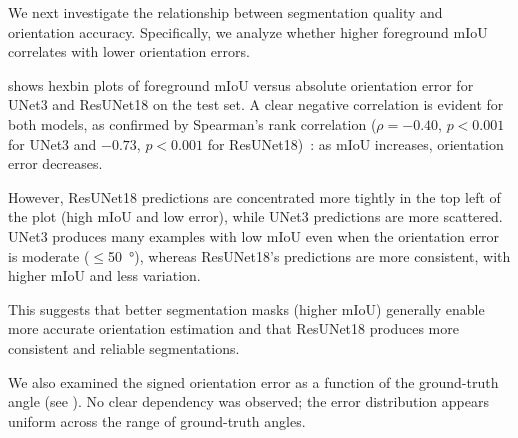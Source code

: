 We next investigate the relationship between segmentation quality and orientation accuracy.
Specifically, we analyze whether higher foreground mIoU correlates with lower orientation errors.

 shows hexbin plots of foreground mIoU versus absolute orientation error for UNet3 and ResUNet18 on the test set.
A clear negative correlation is evident for both models, as confirmed by Spearman's rank correlation ($\rho = -0.40$, $p < 0.001$ for UNet3 and $-0.73$, $p < 0.001$ for ResUNet18)~\cite{noauthor_nodate_spearmans}: as mIoU increases, orientation error decreases.

However, ResUNet18 predictions are concentrated more tightly in the top left of the plot (high mIoU and low error), while UNet3 predictions are more scattered.
UNet3 produces many examples with low mIoU even when the orientation error is moderate ($\leq$\qty{50}{\degree}), whereas ResUNet18’s predictions are more consistent, with higher mIoU and less variation.

This suggests that better segmentation masks (higher mIoU) generally enable more accurate orientation estimation and that ResUNet18 produces more consistent and reliable segmentations.

We also examined the signed orientation error as a function of the ground-truth angle (see ).
No clear dependency was observed; the error distribution appears uniform across the range of ground-truth angles.



